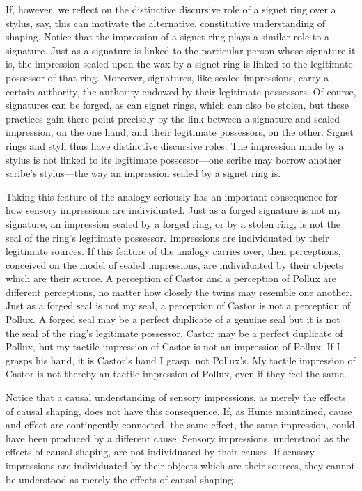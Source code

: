 If, however, we reflect on the distinctive discursive role of a signet ring over a stylus, say, this can motivate the alternative, constitutive understanding of shaping. Notice that the impression of a signet ring plays a similar role to a signature. Just as a signature is linked to the particular person whose signature it is, the impression sealed upon the wax by a signet ring is linked to the legitimate possessor of that ring. Moreover, signatures, like sealed impressions, carry a certain authority, the authority endowed by their legitimate possessors. Of course, signatures can be forged, as can signet rings, which can also be stolen, but these practices gain there point precisely by the link between a signature and sealed impression, on the one hand, and their legitimate possessors, on the other. Signet rings and styli thus have distinctive discursive roles. The impression made by a stylus is not linked to its legitimate possessor---one scribe may borrow another scribe’s stylus---the way an impression sealed by a signet ring is.

Taking this feature of the analogy seriously has an important consequence for how sensory impressions are individuated. Just as a forged signature is not my signature, an impression sealed by a forged ring, or by a stolen ring, is not the seal of the ring’s legitimate possessor. Impressions are individuated by their legitimate sources. If this feature of the analogy carries over, then perceptions, conceived on the model of sealed impressions, are individuated by their objects which are their source. A perception of Castor and a perception of Pollux are different perceptions, no matter how closely the twins may resemble one another. Just as a forged seal is not my seal, a perception of Castor is not a perception of Pollux. A forged seal may be a perfect duplicate of a genuine seal but it is not the seal of the ring’s legitimate possessor. Castor may be a perfect duplicate of Pollux, but my tactile impression of Castor is not an impression of Pollux. If I grasps his hand, it is Castor's hand I grasp, not Pollux's. My tactile impression of Castor is not thereby an tactile impression of Pollux, even if they feel the same.

Notice that a causal understanding of sensory impressions, as merely the effects of causal shaping, does not have this consequence. If, as Hume maintained, cause and effect are contingently connected, the same effect, the same impression, could have been produced by a different cause. Sensory impressions, understood as the effects of causal shaping, are not individuated by their causes. If sensory impressions are individuated by their objects which are their sources, they cannot be understood as merely the effects of causal shaping. 

